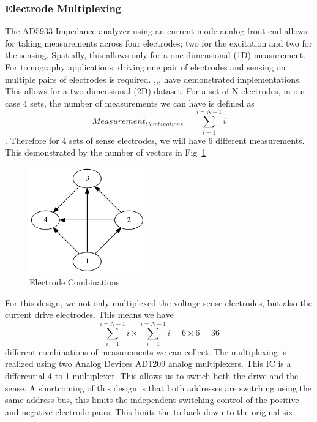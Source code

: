 \documentclass[]{IEEEtran}
\begin{document}
\subsubsection{Electrode Multiplexing}
The AD5933 Impedance analyzer using an current mode analog front end allows for taking measurements across four electrodes; two for the excitation and two for the sensing. Spatially, this allows only for a one-dimensional (1D) measurement. For tomography applications, driving one pair of electrodes and sensing on multiple pairs of electrodes is required. \cite{hua_using_1993},\cite{dimas_development_2017},\cite{wang_electrical_nodate}, \cite{vilchez-monge_image_2017} have demonstrated implementations. This allows for a two-dimensional (2D) dataset. For a set of N electrodes, in our case 4 sets, the number of measurements we can have is defined as \[Measurement_{Combinations}=\sum_{i=1}^{i=N-1}i\]. Therefore for 4 sets of sense electrodes, we will have 6 different measurements. This demonstrated by the number of vectors in Fig~\ref{fig:combo4}

\begin{figure} %
\centering
\includegraphics[width=5cm ]{./graphics/combo4.png}
\centering
\caption{Electrode Combinations}
\label{fig:combo4}
\end{figure}

For this design, we not only multiplexed the voltage sense electrodes, but also the current drive electrodes. This means we have \[\sum_{i=1}^{i=N-1}i\times\sum_{i=1}^{i=N-1}i=6\times6=36\]
different combinations of measurements we can collect. The multiplexing is realized using two Analog Devices AD1209 analog multiplexers. This IC is a differential 4-to-1 multiplexer. This allows us to switch both the drive and the sense. A shortcoming of this design is that both addresses are switching using the same address bus, this limits the independent switching control of the positive and negative electrode pairs. This limits the to back down to the original six.
\end{document}
